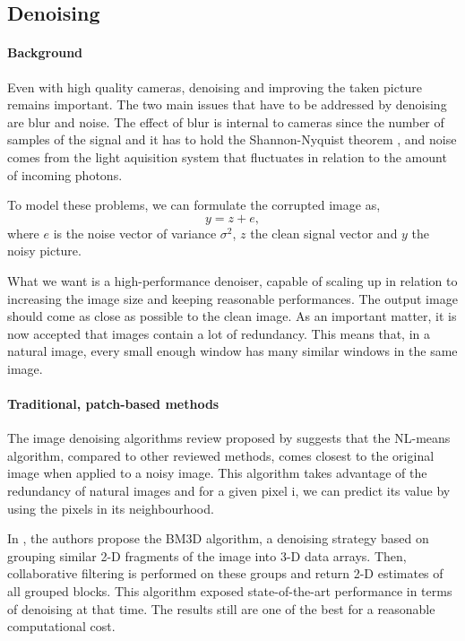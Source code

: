 \subsection{Denoising}

\paragraph{Background}

Even with high quality cameras, denoising and improving the taken picture remains important.
The two main issues that have to be addressed by denoising are blur and noise.
The effect of blur is internal to cameras since the number of samples of the signal and it has to hold the Shannon-Nyquist theorem \cite{buades_review_2005}, and noise comes from the light aquisition system that fluctuates in relation to the amount of incoming photons.

To model these problems, we can formulate the corrupted image as,
\[y = z + e,\]
where \(e\) is the noise vector of variance \(\sigma^2\), \(z\) the clean signal vector and \(y\) the noisy picture.

What we want is a high-performance denoiser, capable of scaling up in relation to increasing the image size and keeping reasonable performances.
The output image should come as close as possible to the clean image.
As an important matter, it is now accepted that images contain a lot of redundancy.
This means that, in a natural image, every small enough window has many similar windows in the same image.

\paragraph{Traditional, patch-based methods}

The image denoising algorithms review proposed by \cite{buades_review_2005} suggests that the NL-means algorithm, compared to other reviewed methods, comes closest to the original image when applied to a noisy image.
This algorithm takes advantage of the redundancy of natural images and for a given pixel i, we can predict its value by using the pixels in its neighbourhood.

In \cite{dabov_image_2007}, the authors propose the BM3D algorithm, a denoising strategy based on grouping similar 2-D fragments of the image into 3-D data arrays. Then, collaborative filtering is performed on these groups and return 2-D estimates of all grouped blocks.
This algorithm exposed state-of-the-art performance in terms of denoising at that time. The results still are one of the best for a reasonable computational cost. 

